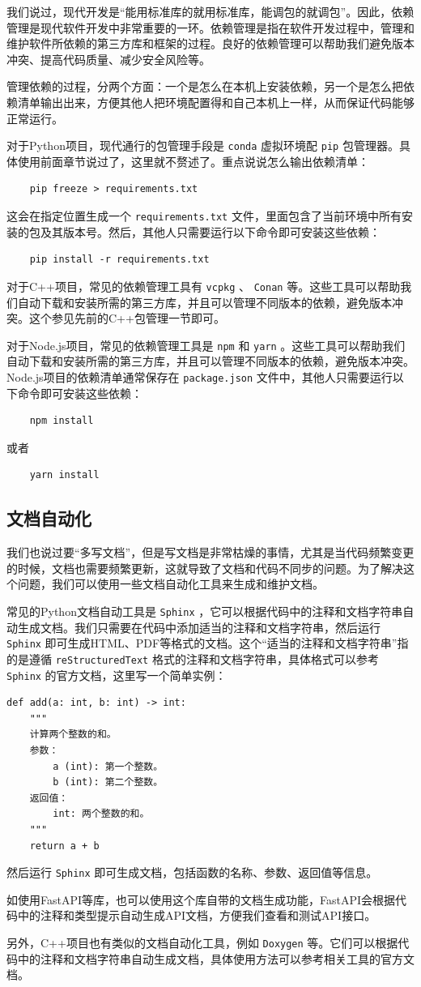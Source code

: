 我们说过，现代开发是“能用标准库的就用标准库，能调包的就调包”。因此，依赖管理是现代软件开发中非常重要的一环。依赖管理是指在软件开发过程中，管理和维护软件所依赖的第三方库和框架的过程。良好的依赖管理可以帮助我们避免版本冲突、提高代码质量、减少安全风险等。

管理依赖的过程，分两个方面：一个是怎么在本机上安装依赖，另一个是怎么把依赖清单输出出来，方便其他人把环境配置得和自己本机上一样，从而保证代码能够正常运行。

对于Python项目，现代通行的包管理手段是 \texttt{conda} 虚拟环境配 \texttt{pip} 包管理器。具体使用前面章节说过了，这里就不赘述了。重点说说怎么输出依赖清单：
\begin{verbatim}
    pip freeze > requirements.txt
\end{verbatim}
这会在指定位置生成一个 \texttt{requirements.txt} 文件，里面包含了当前环境中所有安装的包及其版本号。然后，其他人只需要运行以下命令即可安装这些依赖：
\begin{verbatim}
    pip install -r requirements.txt
\end{verbatim}

对于C++项目，常见的依赖管理工具有 \texttt{vcpkg} 、 \texttt{Conan} 等。这些工具可以帮助我们自动下载和安装所需的第三方库，并且可以管理不同版本的依赖，避免版本冲突。这个参见先前的C++包管理一节即可。

对于Node.js项目，常见的依赖管理工具是 \texttt{npm} 和 \texttt{yarn} 。这些工具可以帮助我们自动下载和安装所需的第三方库，并且可以管理不同版本的依赖，避免版本冲突。Node.js项目的依赖清单通常保存在 \texttt{package.json} 文件中，其他人只需要运行以下命令即可安装这些依赖：
\begin{verbatim}
    npm install
\end{verbatim}
或者
\begin{verbatim}
    yarn install
\end{verbatim}

\subsection{文档自动化}

我们也说过要“多写文档”，但是写文档是非常枯燥的事情，尤其是当代码频繁变更的时候，文档也需要频繁更新，这就导致了文档和代码不同步的问题。为了解决这个问题，我们可以使用一些文档自动化工具来生成和维护文档。

常见的Python文档自动工具是 \texttt{Sphinx} ，它可以根据代码中的注释和文档字符串自动生成文档。我们只需要在代码中添加适当的注释和文档字符串，然后运行 \texttt{Sphinx} 即可生成HTML、PDF等格式的文档。这个“适当的注释和文档字符串”指的是遵循 \texttt{reStructuredText} 格式的注释和文档字符串，具体格式可以参考 \texttt{Sphinx} 的官方文档，这里写一个简单实例：
\begin{verbatim}
def add(a: int, b: int) -> int:
    """
    计算两个整数的和。
    参数：
        a (int): 第一个整数。
        b (int): 第二个整数。
    返回值：
        int: 两个整数的和。
    """
    return a + b
\end{verbatim}
然后运行 \texttt{Sphinx} 即可生成文档，包括函数的名称、参数、返回值等信息。

如使用FastAPI等库，也可以使用这个库自带的文档生成功能，FastAPI会根据代码中的注释和类型提示自动生成API文档，方便我们查看和测试API接口。

另外，C++项目也有类似的文档自动化工具，例如 \texttt{Doxygen} 等。它们可以根据代码中的注释和文档字符串自动生成文档，具体使用方法可以参考相关工具的官方文档。


